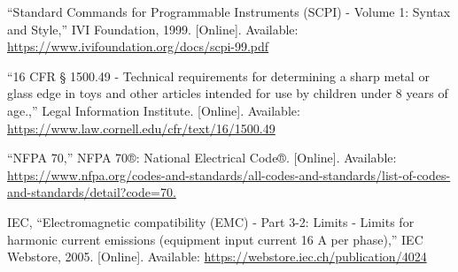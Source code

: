 \documentclass[12pt]{article}
\begin{document}
\begin{thebibliography}{9}
    “Standard Commands for Programmable Instruments (SCPI) - Volume 1: Syntax and Style,” IVI Foundation, 1999. [Online]. Available: \href{https://www.ivifoundation.org/docs/scpi-99.pdf}{https://www.ivifoundation.org/docs/scpi-99.pdf} 

    “16 CFR § 1500.49 - Technical requirements for determining a sharp metal or glass edge in toys and other articles intended for use by children under 8 years of age.,” Legal Information Institute. [Online]. Available: \href{https://www.law.cornell.edu/cfr/text/16/1500.49}{https://www.law.cornell.edu/cfr/text/16/1500.49}
    
    “NFPA 70,” NFPA 70®: National Electrical Code®. [Online]. Available: \href{https://www.nfpa.org/codes-and-standards/all-codes-and-standards/list-of-codes-and-standards/detail?code=70.}
    {https://www.nfpa.org/codes-and-standards/all-codes-and-standards/list-of-codes-and-standards/detail?code=70.}
    
    IEC, “Electromagnetic compatibility (EMC) - Part 3-2: Limits - Limits for harmonic current emissions (equipment input current 16 A per phase),” IEC Webstore, 2005. [Online]. Available:
    \href{https://webstore.iec.ch/publication/4024}{https://webstore.iec.ch/publication/4024}
\end{thebibliography}
\end{document}
